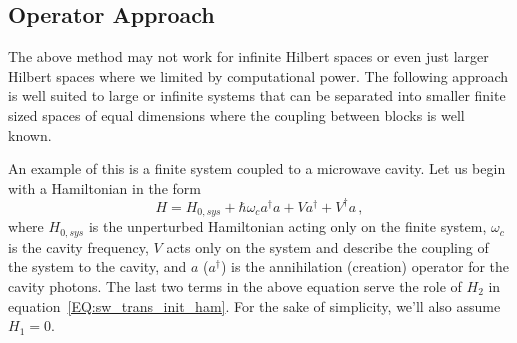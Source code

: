 \subsection{Operator Approach}

The above method may not work for infinite Hilbert spaces or even just larger Hilbert spaces where we limited by computational power.
The following approach is well suited to large or infinite systems that can be separated into smaller finite sized spaces of equal dimensions where the coupling between blocks is well known.

An example of this is a finite system coupled to a microwave cavity. Let us begin with a Hamiltonian in the form
\begin{equation}
    H = H_{0,sys} + \hbar\omega_c a^\dagger a + Va^\dagger + V^\dagger a \,,
\end{equation}
where $H_{0,sys}$ is the unperturbed Hamiltonian acting only on the finite system, $\omega_c$ is the cavity frequency, $V$ acts only on the system and describe the coupling of the system to the cavity, and  $a$ ($a^\dagger$) is the annihilation (creation) operator for the cavity photons. The last two terms in the above equation serve the role of $H_2$ in equation~\ref{EQ:sw_trans_init_ham}.
For the sake of simplicity, we'll also assume $H_1 = 0$.

